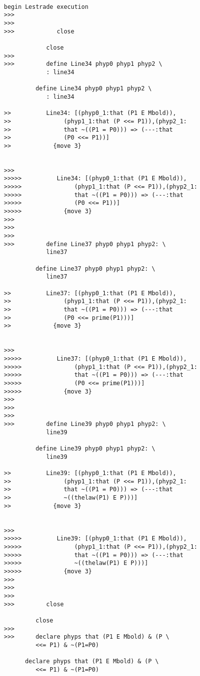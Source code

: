 \documentclass[12pt]{article}
\begin{document}
\begin{verbatim}

begin Lestrade execution
>>>
>>>
>>>            close

            close
>>>
>>>         define Line34 phyp0 phyp1 phyp2 \
            : line34

         define Line34 phyp0 phyp1 phyp2 \
            : line34

>>          Line34: [(phyp0_1:that (P1 E Mbold)),
>>               (phyp1_1:that (P <<= P1)),(phyp2_1:
>>               that ~((P1 = P0))) => (---:that
>>               (P0 <<= P1))]
>>            {move 3}


>>>
>>>>>          Line34: [(phyp0_1:that (P1 E Mbold)),
>>>>>               (phyp1_1:that (P <<= P1)),(phyp2_1:
>>>>>               that ~((P1 = P0))) => (---:that
>>>>>               (P0 <<= P1))]
>>>>>            {move 3}
>>>
>>>
>>>
>>>         define Line37 phyp0 phyp1 phyp2: \
            line37

         define Line37 phyp0 phyp1 phyp2: \
            line37

>>          Line37: [(phyp0_1:that (P1 E Mbold)),
>>               (phyp1_1:that (P <<= P1)),(phyp2_1:
>>               that ~((P1 = P0))) => (---:that
>>               (P0 <<= prime(P1)))]
>>            {move 3}


>>>
>>>>>          Line37: [(phyp0_1:that (P1 E Mbold)),
>>>>>               (phyp1_1:that (P <<= P1)),(phyp2_1:
>>>>>               that ~((P1 = P0))) => (---:that
>>>>>               (P0 <<= prime(P1)))]
>>>>>            {move 3}
>>>
>>>
>>>
>>>         define Line39 phyp0 phyp1 phyp2: \
            line39

         define Line39 phyp0 phyp1 phyp2: \
            line39

>>          Line39: [(phyp0_1:that (P1 E Mbold)),
>>               (phyp1_1:that (P <<= P1)),(phyp2_1:
>>               that ~((P1 = P0))) => (---:that
>>               ~((thelaw(P1) E P)))]
>>            {move 3}


>>>
>>>>>          Line39: [(phyp0_1:that (P1 E Mbold)),
>>>>>               (phyp1_1:that (P <<= P1)),(phyp2_1:
>>>>>               that ~((P1 = P0))) => (---:that
>>>>>               ~((thelaw(P1) E P)))]
>>>>>            {move 3}
>>>
>>>
>>>
>>>         close

         close
>>>
>>>      declare phyps that (P1 E Mbold) & (P \
         <<= P1) & ~(P1=P0)

      declare phyps that (P1 E Mbold) & (P \
         <<= P1) & ~(P1=P0)


\end{verbatim}
\end{document}
